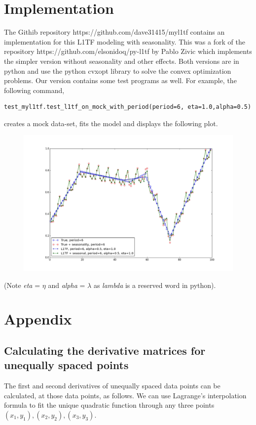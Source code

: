 \documentclass{article}
\begin{document}
\section{Implementation}
The Githib repository https://github.com/dave31415/myl1tf contains an implementation for this
L1TF modeling with seasonality. This was a fork of the repository
https://github.com/elsonidoq/py-l1tf by Pablo Zivic which implements the
simpler version without seasonality and other effects. Both versions are in python and
use the python cvxopt library to solve the convex optimization problems. Our
version contains some test programs as well. For example, the following command,
\begin{verbatim}
test_myl1tf.test_l1tf_on_mock_with_period(period=6, eta=1.0,alpha=0.5)
\end{verbatim}
creates a mock data-set, fits the model and displays the following plot.
\begin{figure}
\centering
\includegraphics[width=500pt]{example.png}
\end{figure}
(Note \emph{eta} = $\eta$ and \emph{alpha} = $\lambda$ as \emph{lambda} is a reserved word in python).

\section{Appendix}
\subsection{Calculating the derivative matrices for unequally spaced points}

The first and second derivatives of unequally spaced data points can be calculated, at those data points,
as follows. We can use Lagrange's interpolation formula to fit the unique quadratic function through any
three points $(x_1,y_1), (x_2,y_2), (x_3, y_3)$.
\end{document}
